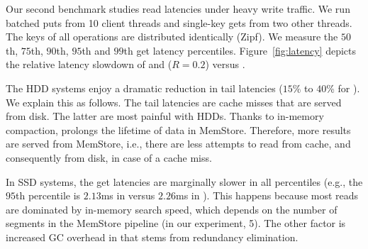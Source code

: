 Our second benchmark studies read latencies under heavy write traffic. 
We run batched puts from 10 client threads and single-key gets from two other threads. 
The keys of all operations are distributed identically (Zipf). We measure the $50$th, 
$75$th, $90$th, $95$th and $99$th get latency percentiles. Figure~\ref{fig:latency} 
depicts the relative latency slowdown of \basic\/ and \adp\/ ($R=0.2$) versus \none.

The HDD systems enjoy a dramatic reduction in tail latencies ($15$\% to $40$\% for \adp). 
We explain this as follows. The tail latencies are cache misses that are served from disk. 
The latter are most painful with HDDs. Thanks to in-memory compaction, \adp\/ prolongs 
the lifetime of data in MemStore. Therefore, more results are served from MemStore, i.e., 
there are less attempts to read from cache, and consequently from disk, in case of a cache miss.  

In SSD systems, the get latencies are marginally slower in all percentiles (e.g., the 
$95$th percentile is $2.13$ms in \none\/ versus $2.26$ms in \adp). This happens
because most reads are dominated by in-memory search speed, which depends on the 
number of segments in the MemStore pipeline (in our experiment, 5). The other factor
is increased GC overhead in \adp\/ that stems from redundancy elimination. 


